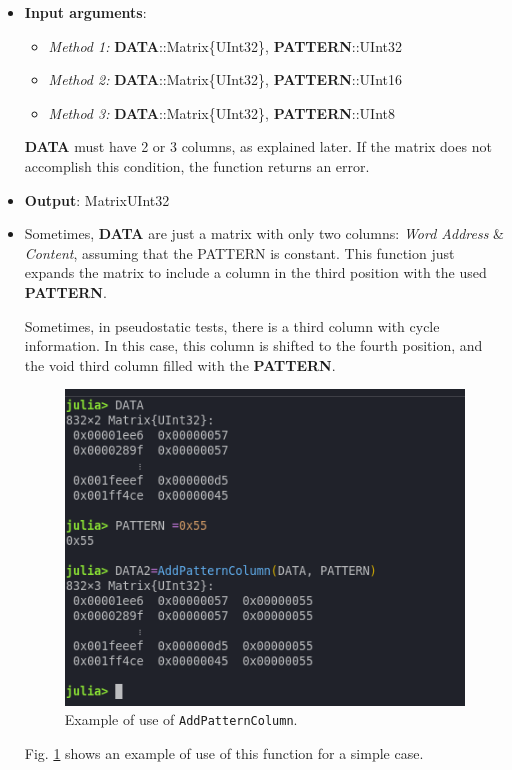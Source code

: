   \begin{itemize}
 	\item \textbf{Input arguments}: 
 	\begin{itemize}
 		\item \textit{Method 1: }\textbf{DATA}::Matrix\{UInt32\}, \textbf{PATTERN}::UInt32
 		\item \textit{Method 2: }\textbf{DATA}::Matrix\{UInt32\}, \textbf{PATTERN}::UInt16
 		\item \textit{Method 3: }\textbf{DATA}::Matrix\{UInt32\}, \textbf{PATTERN}::UInt8
 	\end{itemize}
 
 	\textbf{DATA} must have 2 or 3 columns, as explained later. If the matrix does not accomplish this condition, the function returns an error.
 
 	\item \textbf{Output}: Matrix{UInt32}
 	\item     Sometimes, \textbf{DATA} are just a matrix with only two columns: \textit{Word Address} \& \textit{Content}, assuming that the PATTERN is constant. This function just expands the matrix
 	to include a column in the third position with the used \textbf{PATTERN}. 
 	
 	Sometimes, in pseudostatic tests, there is a third column with cycle information. In this case, this column is shifted to the fourth position, and the void third column filled with the \textbf{PATTERN}. 
 	\begin{figure}[h!]
 		\centering
 		\includegraphics[width=0.65\columnwidth]{fig/functions/AddPatternColumn.png}
 		\caption{Example of use of \texttt{AddPatternColumn}.}
 		\label{fig:Example_AddPatternColumn}
 	\end{figure}
 
 	Fig. \ref{fig:Example_AddPatternColumn} shows an example of use of this function for a simple case.
 
 \end{itemize}
 
